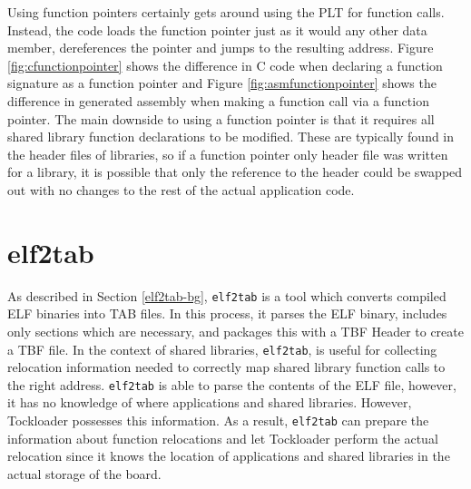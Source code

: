 \documentclass[12pt]{ucsddissertation}
\begin{document}
Using function pointers certainly gets around using the PLT for function calls. Instead, the code loads the function pointer just as it would any other data member, dereferences the pointer and jumps to the resulting address. Figure \ref{fig:cfunctionpointer} shows the difference in C code when declaring a function signature as a function pointer and Figure \ref{fig:asmfunctionpointer} shows the difference in generated assembly when making a function call via a function pointer. The main downside to using a function pointer is that it requires all shared library function declarations to be modified. These are typically found in the header files of libraries, so if a function pointer only header file was written for a library, it is possible that only the reference to the header could be swapped out with no changes to the rest of the actual application code. 

\section{elf2tab} \label{impl-elf2tab}
As described in Section \ref{elf2tab-bg}, \texttt{elf2tab} is a tool which converts compiled ELF binaries into TAB files. In this process, it parses the ELF binary, includes only sections which are necessary, and packages this with a TBF Header to create a TBF file. In the context of shared libraries, \texttt{elf2tab}, is useful for collecting relocation information needed to correctly map shared library function calls to the right address. \texttt{elf2tab} is able to parse the contents of the ELF file, however, it has no knowledge of where applications and shared libraries. However, Tockloader possesses this information. As a result, \texttt{elf2tab} can prepare the information about function relocations and let Tockloader perform the actual relocation since it knows the location of applications and shared libraries in the actual storage of the board. 
\end{document}
